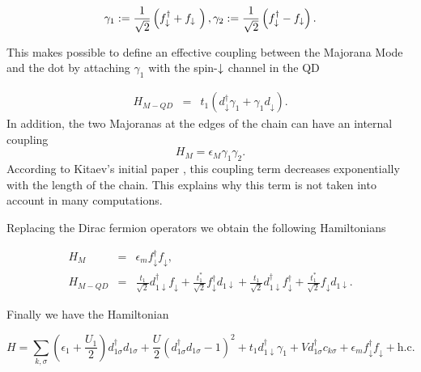 \begin{equation}
\gamma_1 := \frac{1}{\sqrt{2}} \left( f^\dagger_{\downarrow} + f_{\downarrow}\ \right) , \gamma_2 := \frac{1}{\sqrt{2}} \left( f^\dagger_{\downarrow} - f_{\downarrow} \right).
\end{equation}


This makes possible to define an effective coupling between the Majorana Mode and the dot by attaching $\gamma_1$ with the spin-$\downarrow$ channel in the QD

\begin{eqnarray}
H_{M-QD} & = &  t_1 \left(d_{\downarrow}^{\dagger}\gamma_{1}+\gamma_{1}d_{\downarrow}\right) .
\label{eq:MajoranaCoupling}
\end{eqnarray}
\noindent In addition, the two Majoranas at the edges of the chain can have an internal coupling 
\begin{equation}
H_M = \epsilon_M  \gamma_1\gamma_2. 
\end{equation}
\noindent According to Kitaev's initial paper \cite{kitaev_unpaired_2001}, this coupling term decreases exponentially with the length of the chain. This explains why this term is not taken into account in many computations. 



Replacing the Dirac fermion operators we obtain the following Hamiltonians 

\begin{eqnarray}
H_{M} & = & \epsilon_{m}f_{\downarrow}^{\dagger}f_{\downarrow},\\
H_{M-QD}&=&\frac{t_1}{\sqrt{2}}d_{1\downarrow}^{\dagger}f_{\downarrow}+\frac{t_1^{*}}{\sqrt{2}}f_{\downarrow}^{\dagger}d_{1\downarrow}+\frac{t_1}{\sqrt{2}}d_{1\downarrow}^{\dagger}f_{\downarrow}^{\dagger}+\frac{t_1^{*}}{\sqrt{2}}f_{\downarrow}d_{1\downarrow}.
\end{eqnarray}

\noindent Finally we have the Hamiltonian

\begin{equation}
H =\sum_{k,\sigma}\left(\epsilon_1+\frac{U_1}{2}\right)d_{1\sigma}^{\dagger}d_{1\sigma}+ \frac{U}{2}(d_{1\sigma}^{\dagger}d_{1\sigma}-1)^{2} + t_1 d_{1\downarrow}^{\dagger}\gamma_{1} + Vd^\dagger_{1\sigma}c_{k\sigma}+ \epsilon_{m}f_{\downarrow}^{\dagger}f_{\downarrow} + \text{h.c}.
\label{eq:QD-Mham}
\end{equation}


